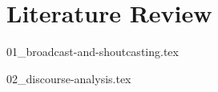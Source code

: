 \cleardoubleoddpage%

\chapter{Literature Review}
\label{chp:literature-review}

{01_broadcast-and-shoutcasting.tex}

{02_discourse-analysis.tex}